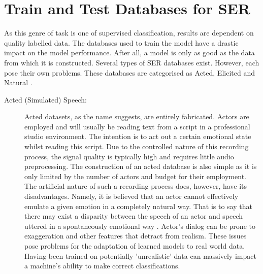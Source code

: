 \section{Train and Test Databases for SER}
As this genre of task is one of supervised classification, results are dependent on quality labelled data. The databases used to train the model have a drastic impact on the model performance. After all, a model is only as good as the data from which it is constructed. Several types of SER databases exist. However, each pose their own problems. These databases are categorised as Acted, Elicited and Natural \cite{surveyCORE1}.
\begin{description}
\item[Acted (Simulated) Speech:]
Acted datasets, as the name suggests, are entirely fabricated. Actors are employed and will usually be reading text from a script in a professional studio environment. The intention is to act out a certain emotional state whilst reading this script. Due to the controlled nature of this recording process, the signal quality is typically high and requires little audio preprocessing. The construction of an acted database is also simple as it is only limited by the number of actors and budget for their employment. The artificial nature of such a recording process does, however, have its disadvantages. Namely, it is believed that an actor cannot effectively emulate a given emotion in a completely natural way. That is to say that there may exist a disparity between the speech of an actor and speech uttered in a spontaneously emotional way \cite{campbell_2000_databases}. Actor's dialog can be prone to exaggeration and other features that detract from realism. These issues pose problems for the adaptation of learned models to real world data. Having been trained on potentially 'unrealistic' data can massively impact a machine's ability to make correct classifications. 


\end{description}
